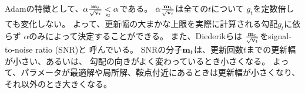 Adamの特徴として、$\alpha \frac{\mathbf{m}_t}{\sqrt{\mathbf{v}_t}}
\underset{\approx}{<} \alpha$である。
$\alpha \frac{\mathbf{m}_t}{\sqrt{\mathbf{v}_t}}$は全ての$t$について
$g_t$を定数倍しても変化しない。
よって、更新幅の大まかな上限を実際に計算される勾配$g_t$に依らず
$\alpha$のみによって決定することができる。
また、Diederikら\cite{diederik15}は
$\frac{\mathbf{m}_t}{\sqrt{\mathbf{v}_t}}$をsignal-to-noise ratio (SNR)と
呼んでいる。
SNRの分子$\mathbf{m}_t$は、更新回数$t$までの更新幅が小さい、あるいは、
勾配の向きがよく変わっているとき小さくなる。
よって、パラメータが最適解や局所解、鞍点付近にあるときは更新幅が小さくなり、
それ以外のとき大きくなる。
